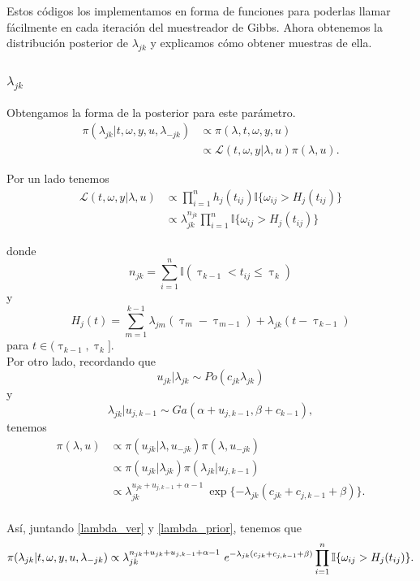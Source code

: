 \documentclass[11pt,a4paper]{article}
\begin{document}
Estos códigos los implementamos en forma de funciones para poderlas llamar fácilmente en cada iteración del muestreador de Gibbs. Ahora obtenemos la distribución posterior de $\lambda_{jk}$ y explicamos cómo obtener muestras de ella.

\subsubsection{$\lambda_{jk}$}
\label{posterior_lambda}

Obtengamos la forma de la posterior para este parámetro.\\

\begin{align*}
\pi(\lambda_{jk} | t, \omega, y, u, \lambda_{-jk}) &\propto \pi(\lambda, t, \omega, y, u)\\
&\propto \mathcal{L}(t, \omega, y | \lambda, u) \pi(\lambda, u).
\end{align*}

Por un lado tenemos
\begin{align} \label{lambda_ver}
\mathcal{L}(t, \omega, y | \lambda, u) &\propto \prod_{i = 1}^n h_j(t_{ij}) \mathbb{I}\lbrace \omega_{ij} > H_j(t_{ij}) \rbrace \nonumber\\
&\propto \lambda_{jk}^{n_{jk}} \prod_{i = 1}^n \mathbb{I}\lbrace \omega_{ij} > H_j(t_{ij}) \rbrace
\end{align}

donde $$n_{jk} = \sum_{i=1}^n \mathbb{I}(\uptau_{k-1} < t_{ij} \leq \uptau_k)$$ y $$H_j(t) = \sum_{m = 1}^{k-1} \lambda_{jm}(\uptau_m - \uptau_{m-1}) + \lambda_{jk}(t - \uptau_{k-1})$$ para $t\in (\uptau_{k-1}, \uptau_k].$\\

Por otro lado, recordando que $$u_{jk}|\lambda_{jk} \sim Po(c_{jk}\lambda_{jk})$$ y $$\lambda_{jk}|u_{j,k-1} \sim Ga(\alpha + u_{j, k-1}, \beta + c_{k-1}),$$ tenemos
\begin{align} \label{lambda_prior}
\pi(\lambda, u) &\propto \pi(u_{jk} | \lambda, u_{-jk})\pi(\lambda, u_{-jk}) \nonumber \\
&\propto \pi(u_{jk} | \lambda_{jk})\pi(\lambda_{jk}| u_{j, k-1}) \nonumber \\
&\propto \lambda_{jk}^{u_{jk} + u_{j, k-1} + \alpha - 1} \ \exp\lbrace-\lambda_{jk}(c_{jk} + c_{j, k-1} + \beta)\rbrace. \nonumber \\
\end{align}

Así, juntando \eqref{lambda_ver} y \eqref{lambda_prior}, tenemos que
\begin{equation*}
\pi(\lambda_{jk} | t, \omega, y, u, \lambda_{-jk}) \propto \lambda_{jk}^{n_{jk} + u_{jk} + u_{j, k-1} + \alpha - 1} \ e^{-\lambda_{jk}(c_{jk} + c_{j, k-1} + \beta)} \prod_{i=1}^n \mathbb{I}\lbrace \omega_{ij} > H_j(t_{ij}) \rbrace.\\
\end{equation*}
\end{document}
